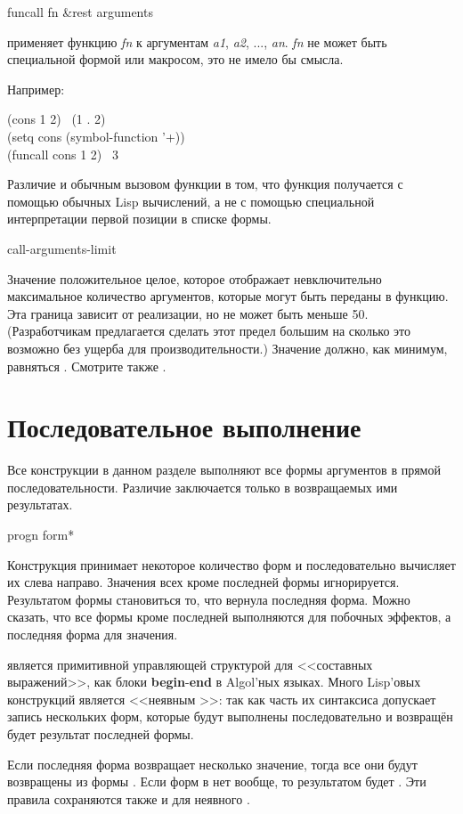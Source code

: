 \begin{defun}[Функция]
funcall fn &rest arguments

применяет функцию \emph{fn} к аргументам 
\emph{a1}, \emph{a2}, ..., \emph{an}.
\emph{fn} не может быть специальной формой или макросом, это не имело бы
смысла. 

Например:
\begin{lisp}
(cons 1 2) \EV\ (1 . 2) \\
(setq cons (symbol-function '+)) \\
(funcall cons 1 2) \EV\ 3
\end{lisp}
Различие  и обычным вызовом функции в том, что функция
получается с помощью обычных Lisp вычислений, а не с помощью специальной
интерпретации первой позиции в списке формы.
\end{defun}

\begin{defun}[Константа]
call-arguments-limit

Значение  положительное целое, которое отображает
невключительно максимальное количество аргументов, которые могут быть переданы в
функцию. Эта граница зависит от реализации, но не может быть меньше 50.
(Разработчикам предлагается сделать этот предел большим на сколько это возможно
без ущерба для производительности.)
Значение  должно, как минимум, равняться
.
Смотрите также .
\end{defun}

\section{Последовательное выполнение}

Все конструкции в данном разделе выполняют все формы аргументов в прямой
последовательности. Различие заключается только в возвращаемых ими результатах.

\begin{defspec}
progn {form}*

Конструкция  принимает некоторое количество форм и последовательно
вычисляет их слева направо. Значения всех кроме последней формы
игнорируется. Результатом формы  становиться то, что вернула
последняя форма.
Можно сказать, что все формы кроме последней выполняются для побочных эффектов,
а последняя форма для значения.

 является примитивной управляющей структурой для <<составных
выражений>>, как блоки \textbf{begin}-\textbf{end} в Algol'ных языках.
Много Lisp'овых конструкций является <<неявным >>:
так как часть их синтаксиса допускает запись нескольких форм,
которые будут выполнены последовательно и возвращён будет результат последней
формы.

Если последняя форма  возвращает несколько значение, тогда все они
будут возвращены из формы . Если форм в  нет вообще, то
результатом будет {\false}. Эти правила сохраняются также и для неявного
.
\end{defspec}

